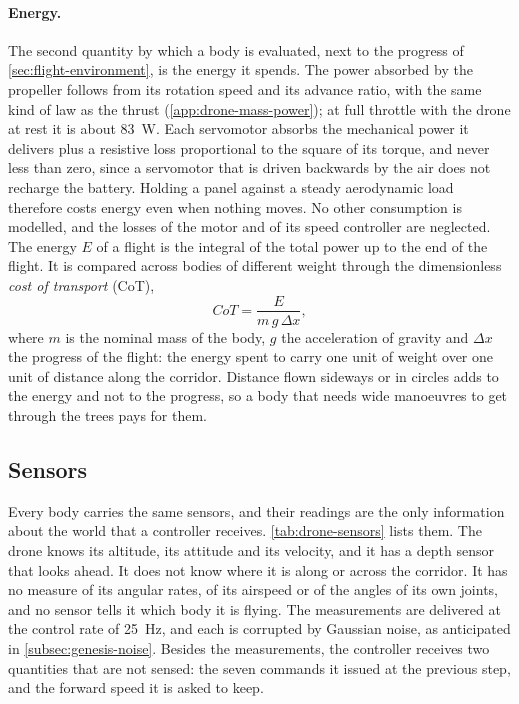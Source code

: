 \paragraph{Energy.} The second quantity by which a body is evaluated, next to the progress of \autoref{sec:flight-environment}, is the energy it spends. The power absorbed by the propeller follows from its rotation speed and its advance ratio, with the same kind of law as the thrust (\autoref{app:drone-mass-power}); at full throttle with the drone at rest it is about 83~W. Each servomotor absorbs the mechanical power it delivers plus a resistive loss proportional to the square of its torque, and never less than zero, since a servomotor that is driven backwards by the air does not recharge the battery. Holding a panel against a steady aerodynamic load therefore costs energy even when nothing moves. No other consumption is modelled, and the losses of the motor and of its speed controller are neglected. The energy $E$ of a flight is the integral of the total power up to the end of the flight. It is compared across bodies of different weight through the dimensionless \emph{cost of transport} (CoT),
\begin{equation}
\mathit{CoT} = \frac{E}{m\, g\, \Delta x},
\label{eq:drone-cot}
\end{equation}
where $m$ is the nominal mass of the body, $g$ the acceleration of gravity and $\Delta x$ the progress of the flight: the energy spent to carry one unit of weight over one unit of distance along the corridor. Distance flown sideways or in circles adds to the energy and not to the progress, so a body that needs wide manoeuvres to get through the trees pays for them.

\subsection{Sensors}
\label{subsec:drone-sensors}

Every body carries the same sensors, and their readings are the only information about the world that a controller receives. \autoref{tab:drone-sensors} lists them. The drone knows its altitude, its attitude and its velocity, and it has a depth sensor that looks ahead. It does not know where it is along or across the corridor. It has no measure of its angular rates, of its airspeed or of the angles of its own joints, and no sensor tells it which body it is flying. The measurements are delivered at the control rate of 25~Hz, and each is corrupted by Gaussian noise, as anticipated in \autoref{subsec:genesis-noise}. Besides the measurements, the controller receives two quantities that are not sensed: the seven commands it issued at the previous step, and the forward speed it is asked to keep.

